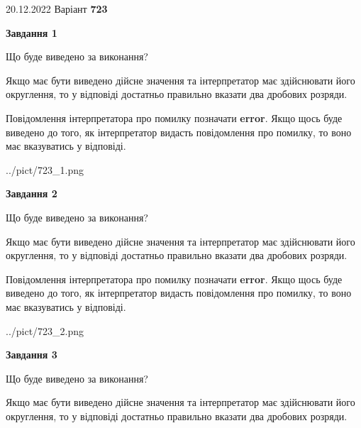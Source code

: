 \documentclass[12pt, ukrainian]{article}
\begin{document}
{20.12.2022 Варіант \No \textbf { 723 }\par}
{
\begin {Large}

{\begin {center}\textbf{Завдання 1}\end {center}}\par
Що буде виведено за виконання? \par

Якщо має бути виведено дійсне значення та інтерпретатор має здійснювати його округлення, 
то у відповіді достатньо правильно вказати два дробових розряди.

Повідомлення інтерпретатора про помилку позначати \textbf{error}.
Якщо щось буде виведено до того, як інтерпретатор видасть повідомлення про помилку, 
то воно має вказуватись у відповіді. \par

\begin{center}
	{../pict/723_1.png}
\end{center}
\newpage

{\begin {center}\textbf{Завдання 2}\end {center}}\par
Що буде виведено за виконання? \par

Якщо має бути виведено дійсне значення та інтерпретатор має здійснювати його округлення, 
то у відповіді достатньо правильно вказати два дробових розряди.

Повідомлення інтерпретатора про помилку позначати \textbf{error}.
Якщо щось буде виведено до того, як інтерпретатор видасть повідомлення про помилку, 
то воно має вказуватись у відповіді. \par

\begin{center}
	{../pict/723_2.png}
\end{center}
\newpage

{\begin {center}\textbf{Завдання 3}\end {center}}\par
Що буде виведено за виконання? \par

Якщо має бути виведено дійсне значення та інтерпретатор має здійснювати його округлення, 
то у відповіді достатньо правильно вказати два дробових розряди.


\end{Large}}
\end{document}
